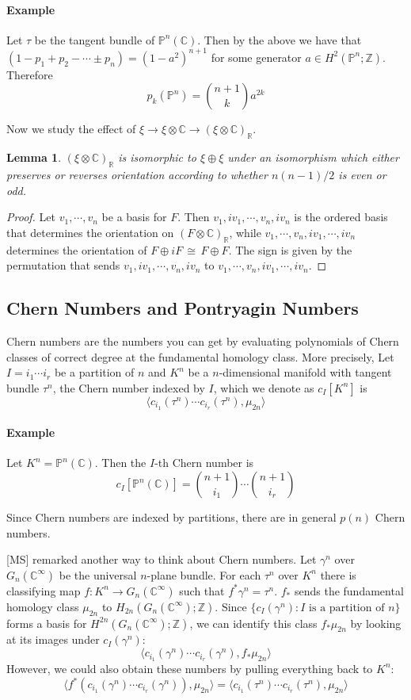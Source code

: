 \documentclass[12pt]{article}
\theoremstyle{plain}
\newtheorem{lemma}[equation]{Lemma}
\theoremstyle{definition}
\newcommand{\IC}{\mathbb{C}}
\newcommand{\IP}{\mathbb{P}}
\newcommand{\IR}{\mathbb{R}}
\newcommand{\IZ}{\mathbb{Z}}
\newcommand\iso{\,{\cong}\,}
\newcommand\tensor{{\otimes}}
\newcommand{\<}{\langle}
\renewcommand{\>}{\rangle}
\begin{document}
\paragraph{Example} Let $\tau$ be the tangent bundle of $\IP^n(\IC)$. Then by the above we have that $(1 - p_1 + p_2 - \cdots \pm p_n ) = (1 - a^2)^{n + 1}$ for some generator $a \in H^2(\IP^n; \IZ)$. Therefore
$$ p_k(\IP^n) = { n + 1 \choose k } a^{2k} $$

Now we study the effect of $\xi \to \xi \tensor \IC \to (\xi \tensor \IC)_\IR$. 

\begin{lemma}
$( \xi \tensor \IC)_\IR$ is isomorphic to $\xi \oplus \xi$ under an isomorphism which either preserves or reverses orientation according to whether $n(n-1)/2$ is even or odd. 
\end{lemma}
\begin{proof}
Let $v_1, \cdots, v_n$ be a basis for $F$. Then $v_1, iv_1, \cdots, v_n, iv_n$ is the ordered basis that determines the orientation on $(F \tensor \IC)_\IR$, while $v_1, \cdots, v_n, iv_1, \cdots, iv_n$ determines the orientation of $F \oplus iF \iso F \oplus F$. The sign is given by the permutation that sends $v_1, iv_1, \cdots, v_n, iv_n$ to $v_1, \cdots, v_n, iv_1, \cdots, iv_n$. 
\end{proof}

\subsection{Chern Numbers and Pontryagin Numbers}
Chern numbers are the numbers you can get by evaluating polynomials of Chern classes of correct degree at the fundamental homology class. More precisely, Let $I = i_1 \cdots i_r$ be a partition of $n$ and $K^n$ be a $n$-dimensional manifold with tangent bundle $\tau^n$, the Chern number indexed by $I$, which we denote as $c_I[K^n]$ is 
$$ \< c_{i_1}(\tau^n) \cdots c_{i_r}(\tau^n), \mu_{2n} \> $$ 

\paragraph{Example} Let $K^n = \IP^n(\IC)$. Then the $I$-th Chern number is 
$$ c_I[\IP^n(\IC)] = {n + 1 \choose i_1} \cdots {n + 1 \choose i_r } $$ 

Since Chern numbers are indexed by partitions, there are in general $p(n)$ Chern numbers. 

[MS] remarked another way to think about Chern numbers. Let $\gamma^n$ over $G_n(\IC^\infty)$ be the universal $n$-plane bundle. For each $\tau^n$ over $K^n$ there is classifying map $f : K^n \to G_n(\IC^\infty)$ such that $f^* \gamma^n = \tau^n$. $f_*$ sends the fundamental homology class $\mu_{2n}$ to $H_{2n}(G_n(\IC^\infty); \IZ)$. Since $\{c_I(\gamma^n) : I \text{ is a partition of }n\}$ forms a basis for $H^{2n}(G_n(\IC^\infty); \IZ)$, we can identify this class $f_* \mu_{2n}$ by looking at its images under $c_I(\gamma^n)$: 
$$ \< c_{i_1}(\gamma^n) \cdots c_{i_r}(\gamma^n), f_* \mu_{2n} \> $$
However, we could also obtain these numbers by pulling everything back to $K^n$: 
$$ \< f^*(c_{i_1}(\gamma^n) \cdots c_{i_r}(\gamma^n)), \mu_{2n} \> = \< c_{i_1}(\tau^n) \cdots c_{i_r}(\tau^n), \mu_{2n} \> $$
\end{document}
